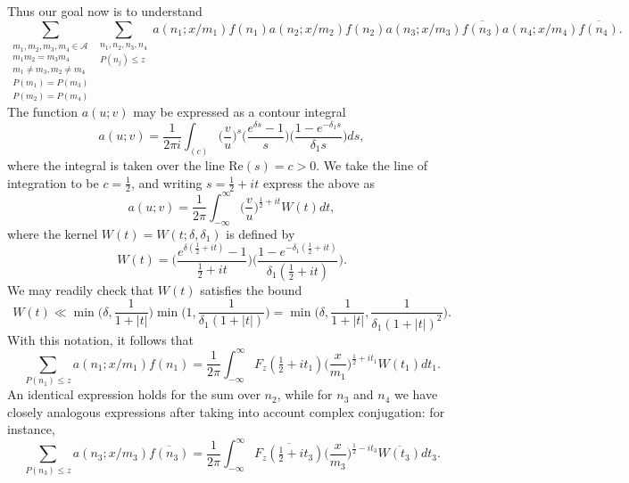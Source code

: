 \documentclass[12pt, notitlepage]{amsart}
\numberwithin{equation}{section}
\def\CA{\mathcal{A}}
\theoremstyle{remark}
\theoremstyle{definition}
\theoremstyle{remark}
\numberwithin{equation}{section}
\begin{document}
 Thus our goal now is to understand 
 \begin{equation} 
 \label{4.7} 
 \sum_{\substack{ m_1, m_2, m_3, m_4 \in \CA \\ m_1 m_2= m_3 m_4 \\ m_1 \neq m_3, m_2\neq m_4 \\ P(m_1)=P(m_3) \\ P(m_2)=P(m_4)}}  
\sum_{\substack{ n_1, n_2, n_3, n_4 \\ P(n_j) \le z}}  a(n_1;x/m_1) f(n_1) a(n_2;x/m_2) f(n_2) a(n_3; x/m_3) \overline{f(n_3)} a(n_4;x/m_4) \overline{f(n_4)}. 
 \end{equation} 
 The function $a(u;v)$ may be expressed as a contour integral 
 $$ 
 a(u;v) = \frac{1}{2\pi i} \int_{(c)} \Big(\frac{v}{u}\Big)^s \Big( \frac{e^{\delta s}-1}{s}\Big) \Big( \frac{1-e^{-\delta_1 s}}{\delta_1 s} \Big) ds, 
 $$ 
 where the integral is taken over the line Re$(s)=c >0$.   We take the line of integration to be $c=\tfrac 12$, and writing $s=\tfrac 12+it$ express the above as 
 $$ 
 a(u;v) = \frac{1}{2\pi} \int_{-\infty}^{\infty} \Big(\frac vu\Big)^{\frac 12+it} W(t) dt, 
 $$ 
 where the kernel $W(t)=W(t;\delta,\delta_1)$ is defined by 
 \begin{equation} 
 \label{4.8} 
 W(t)= \Big(\frac{e^{\delta(\frac 12+it)} -1}{\frac 12+it}\Big) \Big(\frac{1-e^{-\delta_1 (\frac 12+it)}}{\delta_1 (\frac 12+it)}\Big).  
 \end{equation} 
 We may readily check that $W(t)$ satisfies the bound
 \begin{equation} 
 \label{4.9} 
 W(t) \ll \min\Big( \delta, \frac{1}{1+|t|}\Big) \min\Big( 1, \frac{1}{\delta_1 (1+|t|)}\Big) = \min \Big( \delta, \frac{1}{1+|t|}, \frac{1}{\delta_1 (1+|t|)^2}\Big). 
 \end{equation}
 With this notation, it follows that 
 $$
 \sum_{P(n_1)\le z} a(n_1;x/m_1) f(n_1) = \frac{1}{2\pi} \int_{-\infty}^{\infty} F_z(\tfrac 12+it_1) \Big(\frac x{m_1}\Big)^{\frac 12+it_1} W(t_1) dt_1.  
 $$
 An identical expression holds for the sum over $n_2$, while for $n_3$ and $n_4$ we have closely analogous expressions after taking into account complex conjugation: for instance, 
 $$ 
 \sum_{P(n_3) \le z} a(n_3;x/m_3) \overline{f(n_3) }= 
 \frac{1}{2\pi} \int_{-\infty}^{\infty} \overline{F_z(\tfrac 12+it_3)} \Big(\frac{x}{m_3}\Big)^{\frac 12-it_3} \overline{W(t_3)} dt_3. 
 $$ 
 
\end{document}
